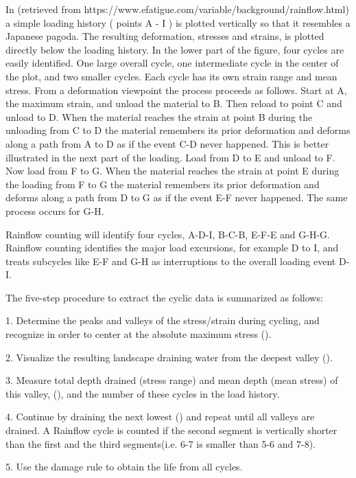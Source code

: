 In (retrieved from https://www.efatigue.com/variable/background/rainflow.html) a simple loading history ( points A - I ) is plotted vertically so that it resembles a Japanese pagoda. The resulting deformation, stresses and strains, is plotted directly below the loading history. In the lower part of the figure, four cycles are easily identified. One large overall cycle, one intermediate cycle in the center of the plot, and two smaller cycles. Each cycle has its own strain range and mean stress. From a deformation viewpoint the process proceeds as follows. Start at A, the maximum strain, and unload the material to B. Then reload to point C and unload to D. When the material reaches the strain at point B during the unloading from C to D the material remembers its prior deformation and deforms along a path from A to D as if the event C-D never happened. This is better illustrated in the next part of the loading. Load from D to E and unload to F. Now load from F to G. When the material reaches the strain at point E during the loading from F to G the material remembers its prior deformation and deforms along a path from D to G as if the event E-F never happened. The same process occurs for G-H.

Rainflow counting will identify four cycles, A-D-I, B-C-B, E-F-E and G-H-G. Rainflow counting identifies the major load excursions, for example D to I, and treats subcycles like E-F and G-H as interruptions to the overall loading event D-I.

\vspace{6pt}
The five-step procedure to extract the cyclic data is summarized as follows:

1.  Determine the peaks and valleys of the stress/strain during cycling, and recognize in order to center at the absolute maximum stress ().

2.  Visualize the resulting landscape draining water from the deepest valley ().

3.  Measure total depth drained (stress range) and mean depth (mean stress) of this valley, (), and the number of these cycles in the load history. 

4.  Continue by draining the next lowest () and repeat until all valleys are drained. A  Rainflow  cycle is counted if the second segment is vertically shorter than the first and the third segments(i.e. 6-7 is smaller than 5-6 and 7-8).

5.  Use the damage rule to obtain the life from all cycles.


